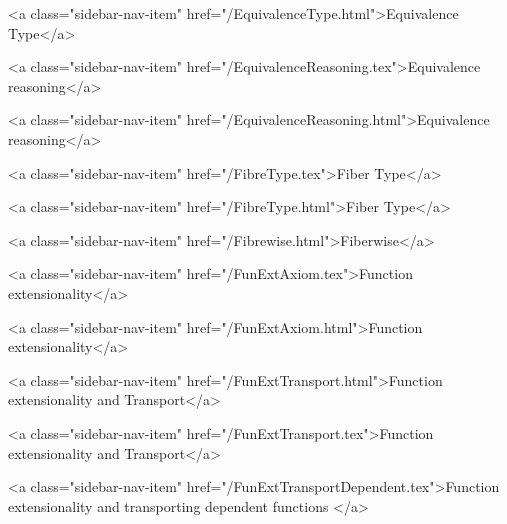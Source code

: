       
    
      
        
          <a class="sidebar-nav-item" href="/EquivalenceType.html">Equivalence Type</a>
        
      
    
      
        
          <a class="sidebar-nav-item" href="/EquivalenceReasoning.tex">Equivalence reasoning</a>
        
      
    
      
        
          <a class="sidebar-nav-item" href="/EquivalenceReasoning.html">Equivalence reasoning</a>
        
      
    
      
        
          <a class="sidebar-nav-item" href="/FibreType.tex">Fiber Type</a>
        
      
    
      
        
          <a class="sidebar-nav-item" href="/FibreType.html">Fiber Type</a>
        
      
    
      
        
          <a class="sidebar-nav-item" href="/Fibrewise.html">Fiberwise</a>
        
      
    
      
        
          <a class="sidebar-nav-item" href="/FunExtAxiom.tex">Function extensionality</a>
        
      
    
      
        
          <a class="sidebar-nav-item" href="/FunExtAxiom.html">Function extensionality</a>
        
      
    
      
        
          <a class="sidebar-nav-item" href="/FunExtTransport.html">Function extensionality and Transport</a>
        
      
    
      
        
          <a class="sidebar-nav-item" href="/FunExtTransport.tex">Function extensionality and Transport</a>
        
      
    
      
        
          <a class="sidebar-nav-item" href="/FunExtTransportDependent.tex">Function extensionality and transporting dependent functions </a>
        
